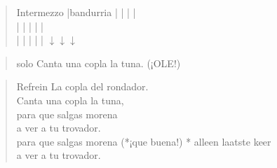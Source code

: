 \begin{verse}{Intermezzo}
|bandurria |  \hspace{3em} | \hspace{4em} | \hspace{2em}  |\\
| \hspace{3.3em} | \hspace{4em} | \hspace{4em} | \hspace{2em}  |\\
| \hspace{3.25em} | \hspace{4em} | \hspace{4em} | \hspace{2em}  | $\downarrow$\hspace{0.5em}$\downarrow$\hspace{0.5em}$\downarrow$
\end{verse}

\begin{verse}{solo}
Canta una copla la tuna. (¡OLE!)
\end{verse}
\clearpage
\begin{verse}{Refrein}
\hspace{1em}La copla del rondador.\\
Canta una copla la tuna,\\
para que salgas morena\\
a ver a tu trovador.\\
para que salgas morena (*¡que buena!)\hspace{2em} * alleen laatste keer\\
a ver a tu trovador.\hspace{1em}
\end{verse}

